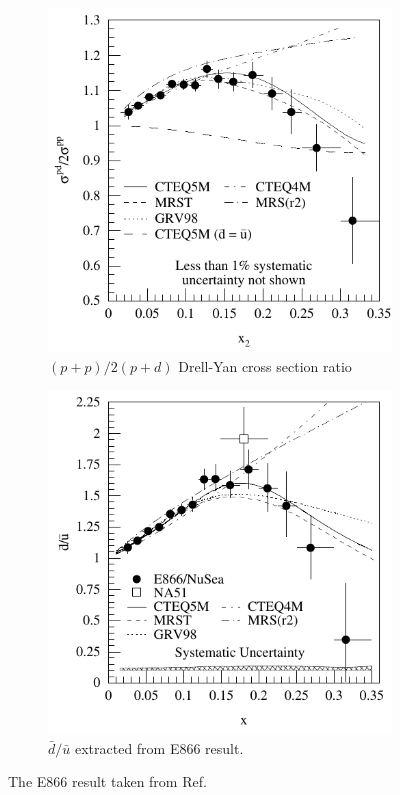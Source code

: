 \begin{figure}[htbp!]
	\centering
	\begin{subfigure}{0.45\linewidth}
		\includegraphics[width=\linewidth]{images/e866_csr}
		\caption{$(p+p)/2(p+d)$ Drell-Yan cross section ratio}
		\label{subfig:e866_csr}
	\end{subfigure}
	\begin{subfigure}{0.45\linewidth}
		\includegraphics[width=\linewidth]{images/e866_dbarubar}
		\caption{$\bar{d}/\bar{u}$ extracted from E866 result.}
		\label{subfig:e866_dbarubar}
	\end{subfigure}
	\caption{The E866 result taken from Ref.\ \cite{fnale866/nuseacollaboration2001}}
	\label{fig:e866_result}
\end{figure}



